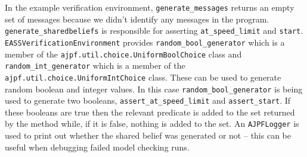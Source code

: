 In the example verification environment, \texttt{generate\_messages} returns an empty set of messages because we didn't identify any messages in the program.  \texttt{generate\_sharedbeliefs} is responsible for asserting \lstinline{at_speed_limit} and \lstinline{start}.  \texttt{EASSVerificationEnvironment} provides \texttt{random\_bool\_generator} which is a member of the \texttt{ajpf.util.choice.UniformBoolChoice} class and \texttt{random\_int\_generator} which is a member of the \texttt{ajpf.util.choice.UniformIntChoice} class.  These can be used to generate random boolean and integer values.  In this case \texttt{random\_bool\_generator} is being used to generate two booleans, \texttt{assert\_at\_speed\_limit} and \texttt{assert\_start}.  If these booleans are true then the relevant predicate is added to the set returned by the method while, if it is false, nothing is added to the set.  An \texttt{AJPFLogger} is used to print out whether the shared belief was generated or not -- this can be useful when debugging failed model checking runs.

